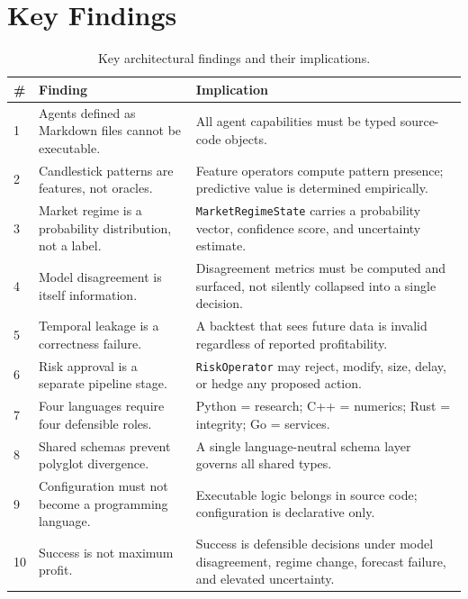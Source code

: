 \documentclass[12pt,openany]{book}
\numberwithin{equation}{chapter}
\theoremstyle{plain}
\theoremstyle{definition}
\theoremstyle{remark}
\begin{document}
\chapter*{Key Findings}

\begin{table}[H]
\centering
\caption{Key architectural findings and their implications.}
\label{tab:key_findings}
\small
\begin{tabularx}{\textwidth}{p{0.5cm} p{5.5cm} p{8.5cm}}
\toprule
\textbf{\#} & \textbf{Finding} & \textbf{Implication} \\
\midrule
1 & Agents defined as Markdown files cannot be executable. &
    All agent capabilities must be typed source-code objects. \\
\midrule
2 & Candlestick patterns are features, not oracles. &
    Feature operators compute pattern presence; predictive value
    is determined empirically. \\
\midrule
3 & Market regime is a probability distribution, not a label. &
    \texttt{MarketRegimeState} carries a probability vector,
    confidence score, and uncertainty estimate. \\
\midrule
4 & Model disagreement is itself information. &
    Disagreement metrics must be computed and surfaced, not silently
    collapsed into a single decision. \\
\midrule
5 & Temporal leakage is a correctness failure. &
    A backtest that sees future data is invalid regardless of
    reported profitability. \\
\midrule
6 & Risk approval is a separate pipeline stage. &
    \texttt{RiskOperator} may reject, modify, size, delay, or hedge
    any proposed action. \\
\midrule
7 & Four languages require four defensible roles. &
    Python = research; C++ = numerics; Rust = integrity; Go = services. \\
\midrule
8 & Shared schemas prevent polyglot divergence. &
    A single language-neutral schema layer governs all shared types. \\
\midrule
9 & Configuration must not become a programming language. &
    Executable logic belongs in source code; configuration is
    declarative only. \\
\midrule
10 & Success is not maximum profit. &
    Success is defensible decisions under model disagreement, regime
    change, forecast failure, and elevated uncertainty. \\
\bottomrule
\end{tabularx}
\end{table}
\end{document}
